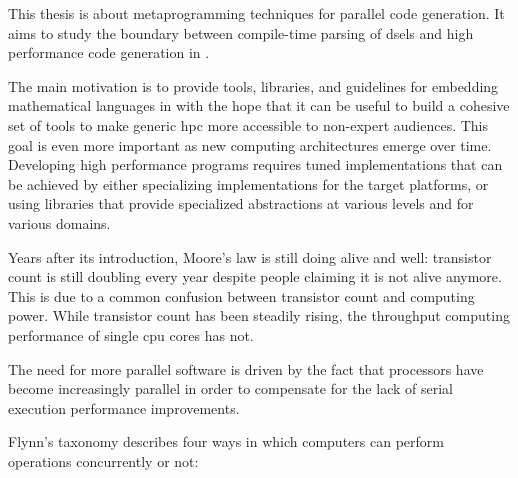 \documentclass[main]{subfiles}
\begin{document}
This thesis is about metaprogramming techniques for parallel code generation.
It aims to study the boundary between compile-time parsing of
\glspl{dsel} and high performance code generation in \cpp.

The main motivation is to provide tools, libraries, and guidelines for embedding
mathematical languages in \cpp with the hope that it can be useful to build a
cohesive set of tools to make generic \gls{hpc} more accessible
to non-expert audiences. This goal is even more important as new computing
architectures emerge over time. Developing high performance programs requires
tuned implementations that can be achieved by either specializing
implementations for the target platforms, or using libraries that provide
specialized abstractions at various levels and for various domains.


Years after its introduction, Moore's law is still doing alive and well:
transistor count is still doubling every year despite people claiming
it is not alive anymore. This is due to a common confusion between
transistor count and computing power. While transistor count has been steadily
rising, the throughput computing performance of single \gls{cpu} cores has not.


The need for more parallel software is driven by the fact that processors have
become increasingly parallel \cite{concurrency-revolution} in order to
compensate for the lack of serial execution performance improvements.


Flynn's taxonomy describes four ways in which computers can perform operations
concurrently or not:
\end{document}
